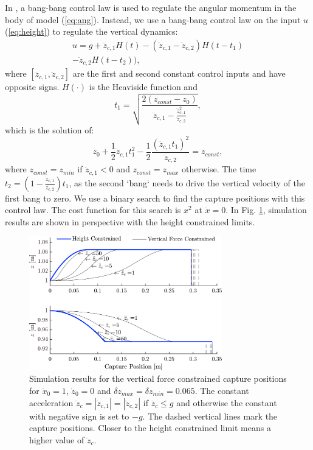 \documentclass[letterpaper, 10 pt, conference]{ieeeconf}  %
\newcommand{\zmin}{z_{min}}
\newcommand{\zmax}{z_{max}}
\newcommand{\ddzcf}{\ddot{z}_{c,1}}
\newcommand{\ddzcs}{\ddot{z}_{c,2}}
\begin{document}
In \cite{pratt2006capture,stephens2007humanoid,koolen2012capturability}, a bang-bang control law is used to regulate the angular momentum in the body of model (\ref{eq:ang}). Instead, we use a bang-bang control law on the input $u$ (\ref{eq:height}) to regulate the vertical dynamics:
\begin{multline}
	u = g + \ddot{z}_{c,1}H(t) - (\ddot{z}_{c,1} - \ddot{z}_{c,2})H(t-t_1) \\ - \ddot{z}_{c,2}H(t-t_2)),
\end{multline}
where $[\ddzcf,\ddzcs]$ are the first and second constant control inputs and have opposite signs. $H(\cdot)$ is the Heaviside function and 
\begin{equation}
t_1=\sqrt{\frac{2(z_{const}-z_0)}{\ddzcf - \frac{\ddzcf^2}{\ddzcs}}},
\end{equation}
which is the solution of:
\begin{equation}
	z_0+\frac{1}{2}\ddzcf t_1^2 - \frac{1}{2}\frac{(\ddzcf t_1)^2}{\ddzcs}= z_{const},
\end{equation}
where $z_{const}=\zmin$ if $\ddzcf <0$ and $z_{const}=\zmax$ otherwise. The time $t_2=(1-\frac{\ddzcf}{\ddzcs})t_1$, as the second `bang` needs to drive the vertical velocity of the first bang to zero. We use a binary search to find the capture positions with this control law. The cost function for this search is $x^2$ at $\dot{x}=0$. In Fig. \ref{fig:zvsf}, simulation results are shown in perspective with the height constrained limits.
\begin{figure}
      \centering
      \includegraphics[width=3.3in]{heightvsforcelim2.png}
      \caption{Simulation results for the vertical force constrained capture positions for $\dot{x}_0=1$, $\dot{z}_0=0$ and $\delta \zmax=\delta \zmin=0.065$. The constant acceleration $\ddot{z}_c=|\ddzcf|=|\ddzcs|$ if $\ddot{z}_c \leq g$ and otherwise the constant with negative sign is set to $-g$. The dashed vertical lines mark the capture positions. Closer to the height constrained limit means a higher value of $\ddot{z}_c$.}
      \label{fig:zvsf}
\end{figure}
\end{document}
